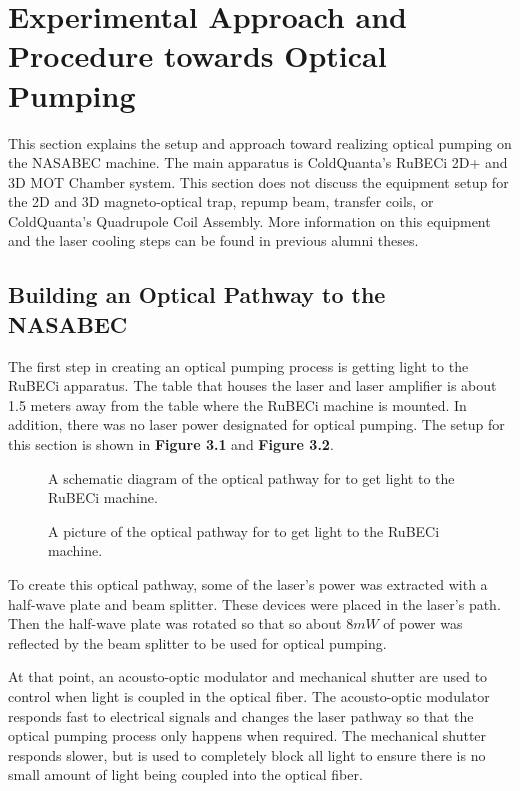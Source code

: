 \chapter{Experimental Approach and Procedure towards Optical Pumping} 
This section explains the setup and approach toward realizing optical pumping on the NASABEC machine. The main apparatus is ColdQuanta's RuBECi 2D+ and 3D MOT Chamber system. This section does not discuss the equipment setup for the 2D and 3D magneto-optical trap, repump beam, transfer coils, or ColdQuanta's Quadrupole Coil Assembly. More information on this equipment and the laser cooling steps can be found in previous alumni theses\cite{sshea}\cite{mcwik}\cite{dpaseltiner}.
\newline

\section{Building an Optical Pathway to the NASABEC}
The first step in creating an optical pumping process is getting light to the RuBECi apparatus. The table that houses the laser and laser amplifier is about 1.5 meters away from the table where the RuBECi machine is mounted. In addition, there was no laser power designated for optical pumping. The setup for this section is shown in \textbf{Figure 3.1} and \textbf{Figure 3.2}. 

\begin{figure}[h!]
\begin{center}
\end{center}
\caption{A schematic diagram of the optical pathway for to get light to the RuBECi machine. }
\end{figure}

\begin{figure}[h!]
\begin{center}
\end{center}
\caption{A picture of the optical pathway for to get light to the RuBECi machine. }
\end{figure}

To create this optical pathway, some of the laser's power was extracted with a half-wave plate and beam splitter. These devices were placed in the laser's path. Then the half-wave plate was rotated so that so about $8mW$ of power was reflected by the beam splitter to be used for optical pumping. 

At that point, an acousto-optic modulator and mechanical shutter are used to control when light is coupled in the optical fiber. The acousto-optic modulator responds fast to electrical signals and changes the laser pathway so that the optical pumping process only happens when required\cite{aom}. The mechanical shutter responds slower, but is used to completely block all light to ensure there is no small amount of light being coupled into the optical fiber\cite{fiberoptics}.

